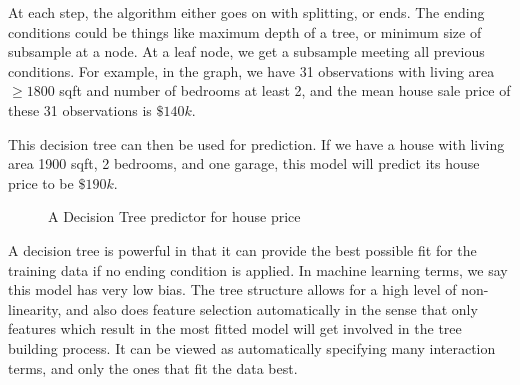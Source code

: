 \documentclass[a4paper]{article}
\begin{document}
At each step, the algorithm either goes on with splitting, or ends. The ending conditions could be things like maximum depth of a tree, or minimum size of subsample at a node. At a leaf node, we get a subsample meeting all previous conditions. For example, in the graph, we have 31 observations with living area $\geq 1800$ sqft and number of bedrooms at least 2, and the mean house sale price of these 31 observations is $\$140k$. 

This decision tree can then be used for prediction. If we have a house with living area 1900 sqft, 2 bedrooms, and one garage, this model will predict its house price to be $\$190k$.

\begin{figure}[H]
\centering
{}
\caption{A Decision Tree predictor for house price}
\end{figure}

A decision tree is powerful in that it can provide the best possible fit for the training data if no ending condition is applied. In machine learning terms, we say this model has very low bias. The tree structure allows for a high level of non-linearity, and also does feature selection automatically in the sense that only features which result in the most fitted model will get involved in the tree building process. It can be viewed as automatically specifying many interaction terms, and only the ones that fit the data best.
\end{document}
